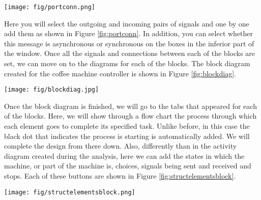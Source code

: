 \documentclass[12pt]{article}
\begin{document}
	\begin{figure*}[htbp]
\centering
\texttt{[image: fig/portconn.png]}
\caption{Port Connection between blocks} \label{fig:portconn}
\end{figure*}

	Here you will select the outgoing and incoming pairs of signals and one by one add them as shown in Figure \ref{fig:portconn}. In addition, you can select whether this message is asynchronous or synchronous on the boxes in the inferior part of the window. Once all the signals and connections between each of the blocks are set, we can move on to the diagrams for each of the blocks.
The block diagram created for the coffee machine controller is shown in Figure \ref{fig:blockdiag}.

	\begin{figure*}[htbp]
\centering
\texttt{[image: fig/blockdiag.jpg]}
\caption{Block diagram} \label{fig:blockdiag}
\end{figure*}

Once the block diagram is finished, we will go to the tabs that appeared for each of the blocks. Here, we will show through a flow chart the process through which each element goes to complete its specified task. Unlike before, in this case the black dot that indicates the process is starting is automatically added. We will complete the design from there down. Also, differently than in the activity diagram created during the analysis, here we can add the states in which the machine, or part of the machine is, choices, signals being sent and received and stops. Each of these buttons are shown in Figure \ref{fig:structelementsblock}. 

\begin{figure*}[htbp]
\centering
\texttt{[image: fig/structelementsblock.png]}
\caption{Structural elements of each block diagram} \label{fig:structelementsblock}
\end{figure*}
\end{document}
